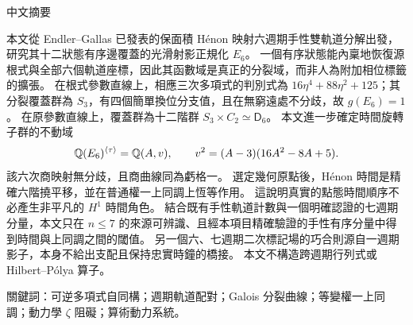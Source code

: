 \begin{otherlanguage}{chinese-traditional}
\begin{center}
{\large 中文摘要}
\end{center}
\begin{sloppypar}
本文從 \foreignlanguage{english}{Endler--Gallas} 已發表的保面積 \foreignlanguage{english}{Hénon} 映射六週期手性雙軌道分解出發，\allowbreak{}研究其十二狀態有序邊覆蓋的光滑射影正規化 $E_6$。\allowbreak{}
一個有序狀態能內稟地恢復源根式與全部六個軌道座標，\allowbreak{}因此其函數域是真正的分裂域，\allowbreak{}而非人為附加相位標籤的擴張。\allowbreak{}
在根式參數直線上，\allowbreak{}相應三次多項式的判別式為 $16\eta^4+88\eta^2+125$；\allowbreak{}其分裂覆蓋群為 $S_3$，\allowbreak{}有四個簡單換位分支值，\allowbreak{}且在無窮遠處不分歧，\allowbreak{}故 $g(E_6)=1$。\allowbreak{}
在原參數直線上，\allowbreak{}覆蓋群為十二階群 $S_3\times C_2\simeq\mathsf D_6$。\allowbreak{}
本文進一步確定時間旋轉子群的不動域
\[
 \mathbb Q(E_6)^{\langle\tau\rangle}=\mathbb Q(A,v),\qquad
 v^2=(A-3)(16A^2-8A+5).
\]
該六次商映射無分歧，\allowbreak{}且商曲線同為虧格一。\allowbreak{}
選定幾何原點後，\allowbreak{}\foreignlanguage{english}{Hénon} 時間是精確六階撓平移，\allowbreak{}並在普通權一上同調上恆等作用。\allowbreak{}
這說明真實的點態時間順序不必產生非平凡的 $H^1$ 時間角色。\allowbreak{}
結合既有手性軌道計數與一個明確認證的七週期分量，\allowbreak{}本文只在 $n\leq7$ 的來源可辨識、且經本項目精確驗證的手性有序分量中得到時間與上同調之間的閾值。\allowbreak{}
另一個六、七週期二次標記場的巧合則源自一週期影子，\allowbreak{}本身不給出支配且保持忠實時鐘的橋接。\allowbreak{}
本文不構造跨週期行列式或 \foreignlanguage{english}{Hilbert--Pólya} 算子。
\end{sloppypar}

\medskip
\noindent 關鍵詞：可逆多項式自同構；週期軌道配對；\foreignlanguage{english}{Galois} 分裂曲線；等變權一上同調；動力學 $\zeta$ 阻礙；算術動力系統。
\end{otherlanguage}
